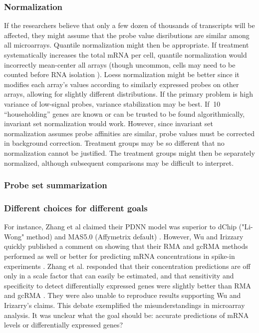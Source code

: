 \subsubsection{Normalization}
If the researchers believe that only a few dozen
of thousands of transcripts will be affected, they might assume that the
probe value disributions are similar among all microarrays. Quantile
normalization might then be appropriate. If treatment
systematically increases the total mRNA per cell, quantile
normalization would incorrectly mean-center all arrays 
(though uncommon, cells may need to be counted before RNA isolation \cite{Loven:2012km}).
Loess normalization might be better since it 
modifies each array's values according to similarly expressed 
probes on other arrays, allowing for slightly different distributions.
If the primary problem is high variance of low-signal probes, variance
stabilization may be best. If $~$10 ``householding'' genes are known
or can be trusted to be found algorithmically, invariant set normalization
would work. However, since invariant set normalization assumes probe affinities
are similar, probe values must be corrected in background correction.
Treatment groups may be so different that
no normalization cannot be justified. The treatment groups might then
be separately normalized, although subsequent comparisons may be difficult to interpret.

\subsubsection{Probe set summarization}


\subsubsection{Different choices for different goals}

For instance, Zhang et al claimed their PDNN model 
was superior to dChip ("Li-Wong" method)
and MAS5.0 (Affymetrix default) \cite{Zhang:2003to}.
However, Wu and Irizzary quickly published a comment on 
showing that their
RMA and gcRMA methods performed as well or better for predicting
mRNA concentrations in spike-in experiments \cite{Wu:2004ul}.
Zhang et al. responded that their concentration predictions
are off only in a scale factor that can easily be estimated, and that
sensitivity and specificity to detect differentially expressed genes
were slightly better than RMA and gcRMA \cite{Zhang:2004tl}. They were also unable to
reproduce results supporting Wu and Irizarry's claims. This
debate exemplified the misunderstandings in microarray analysis.
It was unclear what the goal should be: accurate predictions of mRNA levels or
differentially expressed genes?

